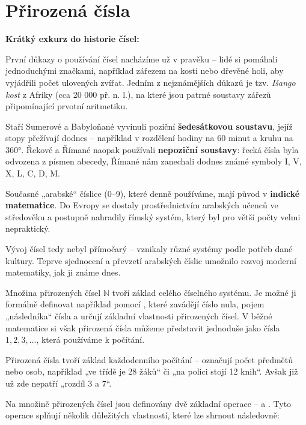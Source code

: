 \documentclass[12pt,a4paper]{article}
\begin{document}
\section{Přirozená čísla}
\begin{historicalbox}
\textbf{Krátký exkurz do historie čísel:}  

První důkazy o používání čísel nacházíme už v pravěku – lidé si pomáhali jednoduchými značkami, například 
zářezem na kosti nebo dřevěné holi, aby vyjádřili počet ulovených zvířat. Jedním z nejznámějších důkazů 
je tzv. \textit{Išango kost} z Afriky (cca 20 000 př. n. l.), na které jsou patrné soustavy zářezů připomínající 
prvotní aritmetiku.  

Staří Sumerové a Babyloňané vyvinuli poziční \textbf{šedesátkovou soustavu}, jejíž stopy přežívají dodnes 
– například v rozdělení hodiny na 60 minut a kruhu na 360°.  
Řekové a Římané naopak používali \textbf{nepoziční soustavy}: řecká čísla byla odvozena z písmen abecedy, 
Římané nám zanechali dodnes známé symboly I, V, X, L, C, D, M.  

Současné „arabské“ číslice (0–9), které denně používáme, mají původ v \textbf{indické matematice}. 
Do Evropy se dostaly prostřednictvím arabských učenců ve středověku a postupně nahradily římský systém, 
který byl pro větší počty velmi nepraktický.  

Vývoj čísel tedy nebyl přímočarý – vznikaly různé systémy podle potřeb dané kultury. 
Teprve sjednocení a převzetí arabských číslic umožnilo rozvoj moderní matematiky, jak ji známe dnes.
\end{historicalbox}


Množina přirozených čísel $\mathbb{N}$ tvoří základ celého číselného systému. 
Je možné ji formálně definovat například pomocí , 
které zavádějí číslo nula, pojem „následníka“ čísla a určují základní vlastnosti 
přirozených čísel. V běžné matematice si však přirozená čísla můžeme 
představit jednoduše jako čísla $1, 2, 3, \dots$, která používáme k počítání.

\begin{notebox}
Přirozená čísla tvoří základ každodenního počítání – označují počet předmětů nebo osob, 
například „ve třídě je 28 žáků“ či „na polici stojí 12 knih“. Avšak již už zde nepatří „rozdíl 3 a 7“.
\end{notebox}

\newpage

Na množině přirozených čísel jsou definovány dvě základní operace – 
 a . 
Tyto operace splňují několik důležitých vlastností, které lze shrnout následovně:
\end{document}
